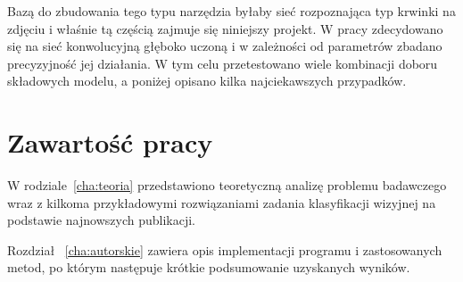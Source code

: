 Bazą do zbudowania tego typu narzędzia byłaby sieć rozpoznająca typ krwinki na zdjęciu i właśnie tą częścią zajmuje się niniejszy projekt. W pracy zdecydowano się na sieć konwolucyjną głęboko uczoną i w zależności od parametrów zbadano precyzyjność jej działania. W tym celu przetestowano wiele kombinacji doboru składowych modelu, a poniżej opisano kilka najciekawszych przypadków.




\section{Zawartość pracy}
\label{sec:zawartoscPracy}

W rodziale~\ref{cha:teoria} przedstawiono teoretyczną analizę problemu badawczego wraz z kilkoma przykładowymi rozwiązaniami zadania klasyfikacji wizyjnej na podstawie najnowszych publikacji.


Rozdział ~\ref{cha:autorskie} zawiera opis implementacji programu i zastosowanych metod, po którym następuje krótkie podsumowanie uzyskanych wyników. 

